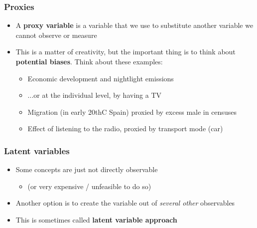 \documentclass[aspectratio=43]{beamer}
\begin{document}
\begin{frame}
\frametitle{Proxies}
\centering

\begin{itemize}
  \item A \textbf{proxy variable} is a variable that we use to substitute another variable we cannot observe or measure
  \item This is a matter of creativity, but the important thing is to think about \textbf{potential biases}. Think about these examples:
  \begin{itemize}
    \item<2-> Economic development and nightlight emissions
    \item<3-> ...or at the individual level, by having a TV
    \item<4-> Migration (in early 20thC Spain) proxied by excess male in censuses
    \item<5-> Effect of listening to the radio, proxied by transport mode (car)
  \end{itemize}
\end{itemize}

\end{frame}

\begin{frame}
\frametitle{Latent variables}
\centering

\begin{itemize}
  \item Some concepts are just not directly observable
  \begin{itemize}
    \item (or very expensive / unfeasible to do so)
  \end{itemize}
  \item Another option is to create the variable out of \textit{several other} observables
  \item This is sometimes called \textbf{latent variable approach}
\end{itemize}

\end{frame}
\end{document}
